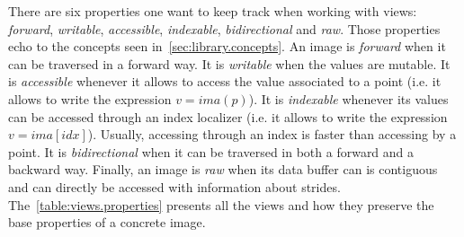There are six properties one want to keep track when working with views: \emph{forward}, \emph{writable},
\emph{accessible}, \emph{indexable}, \emph{bidirectional} and \emph{raw}. Those properties echo to the concepts seen
in~\cref{sec:library.concepts}. An image is \emph{forward} when it can be traversed in a forward way. It is
\emph{writable} when the values are mutable. It is \emph{accessible} whenever it allows to access the value associated
to a point (i.e. it allows to write the expression \(v = ima(p)\)). It is \emph{indexable} whenever its values can be
accessed through an index localizer (i.e. it allows to write the expression \(v = ima[idx]\)). Usually, accessing
through an index is faster than accessing by a point. It is \emph{bidirectional} when it can be traversed in both a
forward and a backward way. Finally, an image is \emph{raw} when its data buffer can is contiguous and can directly be
accessed with information about strides. The~\cref{table:views.properties} presents all the views and how they preserve
the base properties of a concrete image.

